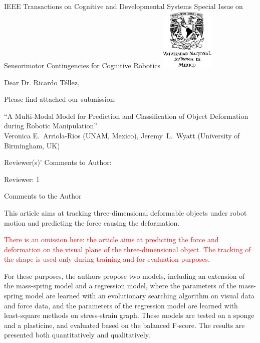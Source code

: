 \documentclass[a4paper,12pt]{letter}
\newcommand{\comment}[1]{\textcolor{red}{#1}}
\begin{document}

\begin{letter}{IEEE Transactions on Cognitive and Developmental Systems\newline
Special Issue on Sensorimotor Contingencies for Cognitive Robotics}
\includegraphics[height=3cm, keepaspectratio=true]{figures/unam.jpg}\vspace*{-3cm}
\address{Facultad de Ciencias, \\Ciudad Universitaria,\\ UNAM, México, D.F.}

\opening{Dear Dr. Ricardo Téllez,}

Please find attached our submission:
\begin{center}
 ``A Multi-Modal Model for Prediction and Classification of Object Deformation during Robotic Manipulation'' \\
 Veronica E.~Arriola-Rios (UNAM, Mexico), Jeremy~L.~Wyatt (University of Birmingham, UK)
\end{center}

Reviewer(s)' Comments to Author: 

Reviewer: 1 

Comments to the Author 

This article aims at tracking three-dimensional deformable objects under robot motion and predicting the force causing the deformation.

\comment{There is an omission here: the article aims at predicting the force and deformation on the visual plane of the three-dimensional object.  The tracking of the shape is used only during training and for evaluation purposes.}

For these purposes, the authors propose two models, including an extension of the mass-spring model and a regression model, where the parameters of the mass-spring model are learned with an evolutionary searching algorithm on visual data and force data, and the parameters of the regression model are learned with least-square methods on stress-strain graph. These models are tested on a sponge and a plasticine, and evaluated based on the balanced F-score. The results are presented both quantitatively and qualitatively. 


\end{letter}
\end{document}
